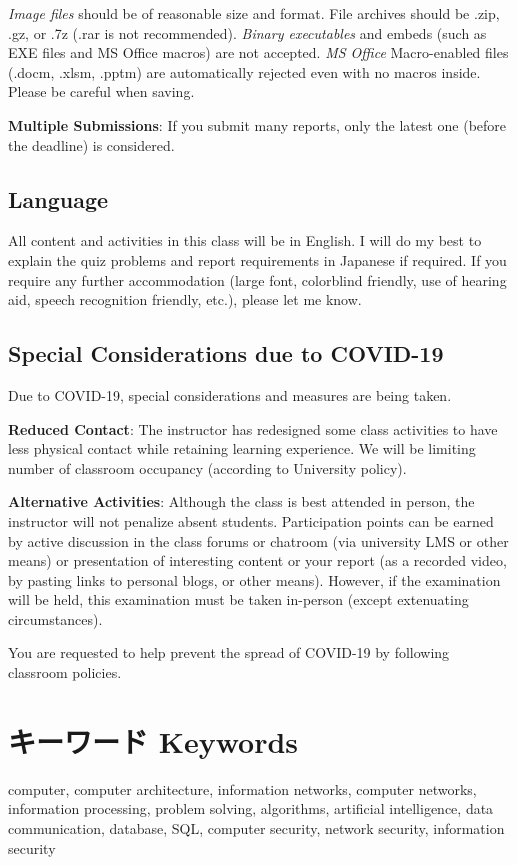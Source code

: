 \documentclass[a4paper]{article}
\begin{document}
\textit{Image files} should be of reasonable size and format. File archives should be .zip, .gz, or .7z (.rar is not recommended). \textit{Binary executables} and embeds (such as EXE files and MS Office macros) are not accepted. \textit{MS Office} Macro-enabled files (.docm, .xlsm, .pptm) are automatically rejected even with no macros inside. Please be careful when saving.

\smallskip\noindent
\textbf{Multiple Submissions}: If you submit many reports, only the latest one (before the deadline) is considered.

\subsection{Language}

All content and activities in this class will be in English. I will do my best to explain the quiz problems and report requirements in Japanese if required. If you require any further accommodation (large font, colorblind friendly, use of hearing aid, speech recognition friendly, etc.), please let me know.

\subsection{Special Considerations due to COVID-19}

Due to COVID-19, special considerations and measures are being taken.

\textbf{Reduced Contact}: The instructor has redesigned some class activities to have less physical contact while retaining learning experience. We will be limiting number of classroom occupancy (according to University policy).

\textbf{Alternative Activities}: Although the class is best attended in person, the instructor will not penalize absent students. Participation points can be earned by active discussion in the class forums or chatroom (via university LMS or other means) or presentation of interesting content or your report (as a recorded video, by pasting links to personal blogs, or other means). However, if the examination will be held, this examination must be taken in-person (except extenuating
circumstances).

You are requested to help prevent the spread of COVID-19 by following classroom policies.

\section{キーワード Keywords}
computer, computer architecture, information networks, computer networks, information processing, problem solving, algorithms, artificial intelligence, data communication, database, SQL, computer security, network security, information security
\end{document}
